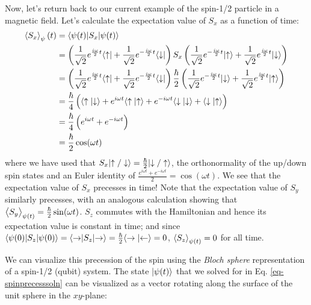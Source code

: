 Now, let's return back to our current example of the spin-1/2 particle in a magnetic field. Let's calculate the expectation value of $S_x$ as a function of time:
\begin{equation}
    \begin{split}
        \left< S_x \right>_\psi(t) &= \langle \psi(t) \rvert S_x\lvert \psi(t) \rangle
        \\ &= \left(\frac{1}{\sqrt{2}}e^{\frac{i\omega}{2}t}\langle \uparrow \rvert + \frac{1}{\sqrt{2}}e^{-\frac{i\omega}{2} t}\langle \downarrow \rvert\right)S_x\left(\frac{1}{\sqrt{2}}e^{-\frac{i\omega}{2}t}\lvert \uparrow \rangle + \frac{1}{\sqrt{2}}e^{\frac{i\omega}{2} t}\lvert \downarrow \rangle\right)
        \\ &= \left(\frac{1}{\sqrt{2}}e^{\frac{i\omega}{2}t}\langle \uparrow \rvert + \frac{1}{\sqrt{2}}e^{-\frac{i\omega}{2} t}\langle \downarrow \rvert\right)\frac{\hbar}{2}\left(\frac{1}{\sqrt{2}}e^{-\frac{i\omega}{2}t}\lvert \downarrow \rangle + \frac{1}{\sqrt{2}}e^{\frac{i\omega}{2} t}\lvert \uparrow \rangle\right)
        \\ &= \frac{\hbar}{4}\left(\langle \uparrow \lvert \downarrow \rangle + e^{i\omega t}\langle \uparrow \lvert \uparrow \rangle + e^{-i\omega t}\langle \downarrow \lvert \downarrow \rangle + \langle \downarrow \lvert \uparrow \rangle\right)
        \\ &= \frac{\hbar}{4}\left(e^{i\omega t} + e^{-i\omega t}\right)
        \\ &= \frac{\hbar}{2}\cos(\omega t)
    \end{split}
\end{equation}
where we have used that $S_x\lvert \uparrow/\downarrow \rangle = \frac{\hbar}{2}\lvert \downarrow/\uparrow \rangle$, the orthonormality of the up/down spin states and an Euler identity of $\frac{e^{i\omega t} + e^{-i\omega t}}{2} = \cos(\omega t)$. We see that the expectation value of $S_x$ precesses in time! Note that the expectation value of $S_y$ similarly precesses, with an analogous calculation showing that $\left< S_y \right>_{\psi(t)} = \frac{\hbar}{2}\sin(\omega t)$. $S_z$ commutes with the Hamiltonian and hence its expectation value is constant in time; and since $\langle \psi(0) \rvert S_z\lvert \psi(0) \rangle = \langle \rightarrow \rvert S_z\lvert \rightarrow \rangle = \frac{\hbar}{2}\langle \rightarrow \lvert \leftarrow \rangle = 0$, $\left< S_z \right>_{\psi(t)} = 0$ for all time.

We can visualize this precession of the spin using the \emph{Bloch sphere} representation of a spin-1/2 (qubit) system. The state $\lvert \psi(t) \rangle$ that we solved for in Eq. \eqref{eq-spinprecesssoln} can be visualized as a vector rotating along the surface of the unit sphere in the $xy$-plane:

